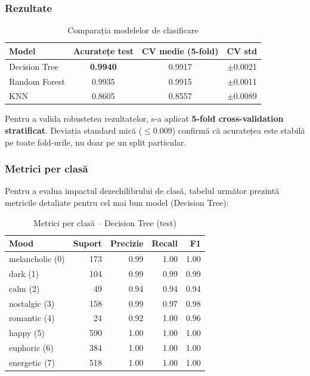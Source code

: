 \documentclass[12pt,a4paper]{article}
\begin{document}
\subsubsection{Rezultate}

\begin{table}[H]
\centering
\caption{Comparația modelelor de clasificare}
\label{tab:results}
\begin{tabular}{lccc}
\toprule
\textbf{Model} & \textbf{Acuratețe test} & \textbf{CV medie (5-fold)} & \textbf{CV std} \\
\midrule
Decision Tree   & \textbf{0.9940} & 0.9917 & $\pm$0.0021 \\
Random Forest   & 0.9935          & 0.9915 & $\pm$0.0011 \\
KNN             & 0.8605          & 0.8557 & $\pm$0.0089 \\
\bottomrule
\end{tabular}
\end{table}

Pentru a valida robustetea rezultatelor, s-a aplicat \textbf{5-fold cross-validation stratificat}. Deviația standard mică ($\leq 0.009$) confirmă că acuratețea este stabilă pe toate fold-urile, nu doar pe un split particular.

\subsubsection{Metrici per clasă}

Pentru a evalua impactul dezechilibrului de clasă, tabelul următor prezintă metricile detaliate pentru cel mai bun model (Decision Tree):

\begin{table}[H]
\centering
\caption{Metrici per clasă -- Decision Tree (test)}
\label{tab:perclass}
\small
\begin{tabular}{lrrrr}
\toprule
\textbf{Mood} & \textbf{Suport} & \textbf{Precizie} & \textbf{Recall} & \textbf{F1} \\
\midrule
melancholic (0) & 173 & 0.99 & 1.00 & 1.00 \\
dark (1)        & 104 & 0.99 & 0.99 & 0.99 \\
calm (2)        &  49 & 0.94 & 0.94 & 0.94 \\
nostalgic (3)   & 158 & 0.99 & 0.97 & 0.98 \\
romantic (4)    &  24 & 0.92 & 1.00 & 0.96 \\
happy (5)       & 590 & 1.00 & 1.00 & 1.00 \\
euphoric (6)    & 384 & 1.00 & 1.00 & 1.00 \\
energetic (7)   & 518 & 1.00 & 1.00 & 1.00 \\
\bottomrule
\end{tabular}
\end{table}
\end{document}
